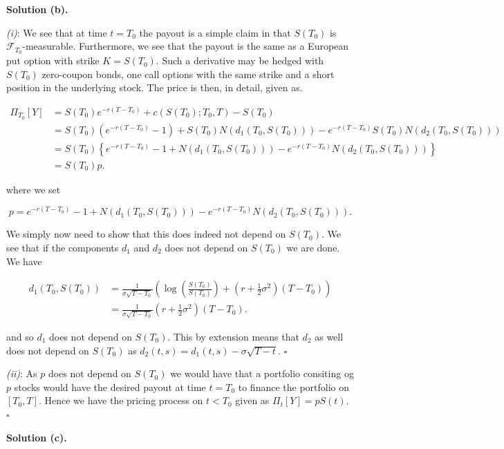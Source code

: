\documentclass[
]{book}
\begin{document}
\noindent\makebox[\linewidth]{\rule{\textwidth}{0.4pt}}

\textbf{Solution (b).}

\emph{(i)}: We see that at time \(t=T_0\) the payout is a simple claim in that \(S(T_0)\) is \(\mathcal{F}_{T_0}\)-measurable. Furthermore, we see that the payout is the same as a European put option with strike \(K=S(T_0)\). Such a derivative may be hedged with \(S(T_0)\) zero-coupon bonds, one call options with the same strike and a short position in the underlying stock. The price is then, in detail, given as.

\begin{align*}
\Pi_{T_0}[Y]&=S(T_0)e^{-r(T-T_0)}+c(S(T_0);T_0,T)-S(T_0)\\
&=S(T_0)\left(e^{-r(T-T_0)}-1\right)+S(T_0)N(d_1(T_0,S(T_0)))-e^{-r(T-T_0)}S(T_0)N(d_2(T_0,S(T_0)))\\
&=S(T_0)\left\{e^{-r(T-T_0)}-1+N(d_1(T_0,S(T_0)))-e^{-r(T-T_0)}N(d_2(T_0,S(T_0)))\right\}\\
&=S(T_0)p.
\end{align*}

where we set

\[
p=e^{-r(T-T_0)}-1+N(d_1(T_0,S(T_0)))-e^{-r(T-T_0)}N(d_2(T_0,S(T_0))).
\]

We simply now need to show that this does indeed not depend on \(S(T_0)\). We see that if the components \(d_1\) and \(d_2\) does not depend on \(S(T_0)\) we are done. We have

\begin{align*}
d_1(T_0,S(T_0))&=\frac{1}{\sigma\sqrt{T-T_0}}\left(\log\left(\frac{S(T_0)}{S(T_0)}\right)+\left(r+\frac{1}{2}\sigma^2\right)(T-T_0)\right)\\
&=\frac{1}{\sigma\sqrt{T-T_0}}\left(r+\frac{1}{2}\sigma^2\right)(T-T_0).
\end{align*}

and so \(d_1\) does not depend on \(S(T_0)\). This by extension means that \(d_2\) as well does not depend on \(S(T_0)\) as \(d_2(t,s)=d_1(t,s)-\sigma\sqrt{T-t}\). \(\square\)

\emph{(ii)}: As \(p\) does not depend on \(S(T_0)\) we would have that a portfolio consiting og \(p\) stocks would have the desired payout at time \(t=T_0\) to finance the portfolio on \([T_0,T]\). Hence we have the pricing process on \(t<T_0\) given as \(\Pi_t[Y]=pS(t)\). \(\square\)

\noindent\makebox[\linewidth]{\rule{\textwidth}{0.4pt}}

\textbf{Solution (c).}
\end{document}
